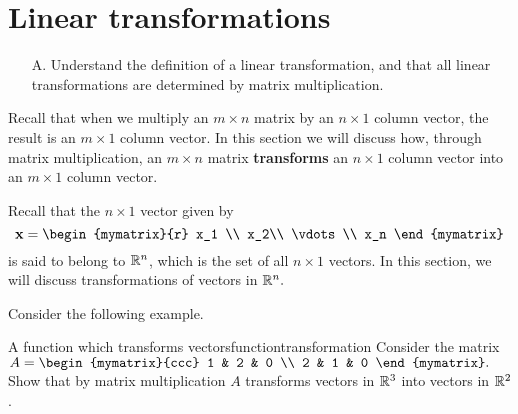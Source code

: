 \section{Linear transformations}

\begin{outcome}
\begin{enumerate}
\item[A.]  Understand the definition of a linear transformation, and that all linear transformations are determined by matrix multiplication.
\end{enumerate}
\end{outcome}

Recall that when we multiply an $m\times n$ matrix by an $n\times 1 $
column vector, the result is an $m\times 1$ column vector. In this
section we will discuss how, through matrix multiplication, an $m
\times n$ matrix \textbf{transforms} an $n\times 1$ column vector into
an $m \times 1$ column vector.

Recall that the $n \times 1$ vector given by
\begin{equation*}
\vect{x} = 
\begin{mymatrix}{r}
x_1 \\
x_2\\ 
\vdots \\
x_n
\end{mymatrix}
\end{equation*}
is said to belong to $\mathbb{R}^n$, which is the set of all $n \times 1$ vectors. In this section, we will discuss transformations of vectors in $\mathbb{R}^n.$ 

Consider the following example. 

\begin{example}{A function which transforms vectors}{functiontransformation}
Consider the matrix $A = \begin{mymatrix}{ccc}
1 & 2 & 0 \\
2 & 1 & 0
\end{mymatrix} .$ 
Show that by matrix multiplication $A$ transforms vectors in $\mathbb{R}^3$ into vectors in $\mathbb{R}^2$.
\end{example}

